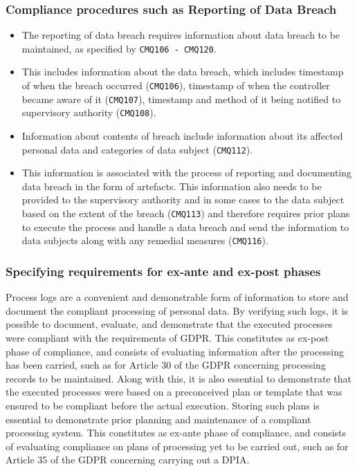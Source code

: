 \subsubsection{Compliance procedures such as Reporting of Data Breach}
\begin{itemize}
    \item The reporting of data breach requires information about data breach to be maintained, as specified by \texttt{CMQ106 - CMQ120}.
    \item This includes information about the data breach, which includes timestamp of when the breach occurred (\texttt{CMQ106}), timestamp of when the controller became aware of it (\texttt{CMQ107}), timestamp and method of it being notified to supervisory authority (\texttt{CMQ108}).
    \item Information about contents of breach include information about its affected personal data and categories of data subject (\texttt{CMQ112}).
    \item This information is associated with the process of reporting and documenting data breach in the form of artefacts. This information also needs to be provided to the supervisory authority and in some cases to the data subject based on the extent of the breach (\texttt{CMQ113}) and therefore requires prior plans to execute the process and handle a data breach and send the information to data subjects along with any remedial measures (\texttt{CMQ116}).
\end{itemize}

\subsubsection{Specifying requirements for ex-ante and ex-post phases}
Process logs are a convenient and demonstrable form of information to store and document the compliant processing of personal data. By verifying such logs, it is possible to document, evaluate, and demonstrate that the executed processes were compliant with the requirements of GDPR. This constitutes as ex-post phase of compliance, and consists of evaluating information after the processing has been carried, such as for Article 30 of the GDPR concerning processing records to be maintained. Along with this, it is also essential to demonstrate that the executed processes were based on a preconceived plan or template that was ensured to be compliant before the actual execution. Storing such plans is essential to demonstrate prior planning and maintenance of a compliant processing system. This constitutes as ex-ante phase of compliance, and consists of evaluating compliance on plans of processing yet to be carried out, such as for Article 35 of the GDPR concerning carrying out a DPIA.

